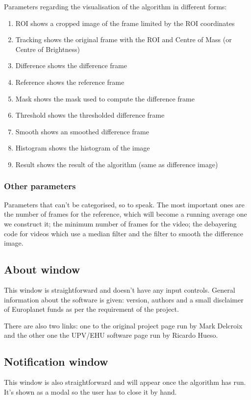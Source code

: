 \documentclass[a4paper,11pt]{memoir}
\begin{document}
Parameters regarding the visualisation of the algorithm in different forms:
\begin{enumerate}
\item ROI shows a cropped image of the frame limited by the ROI coordinates
\item Tracking shows the original frame with the ROI and Centre of Mass (or Centre of Brightness)
\item Difference shows the difference frame
\item Reference shows the reference frame
\item Mask shows the mask used to compute the difference frame
\item Threshold shows the thresholded difference frame
\item Smooth shows an smoothed difference frame
\item Histogram shows the histogram of the image
\item Result shows the result of the algorithm (same as difference image)
\end{enumerate}

\subsubsection{Other parameters}
Parameters that can’t be categorised, so to speak. The most important ones are the number of frames for the reference, which will become a running average one we construct it; the minimum number of frames for the video; the debayering code for videos which use a median filter and the filter to smooth the difference image.

\subsection{About window}
This window is straightforward and doesn’t have any input controls. General information about the software is given: version, authors and a small disclaimer of Europlanet funds as per the requirement of the project.

There are also two links: one to the original project page run by Mark Delcroix and the other one the UPV/EHU software page run by Ricardo Hueso.

\subsection{Notification window}
This window is also straightforward and will appear once the algorithm has run. It’s shown as a modal so the user has to close it by hand.
\end{document}
